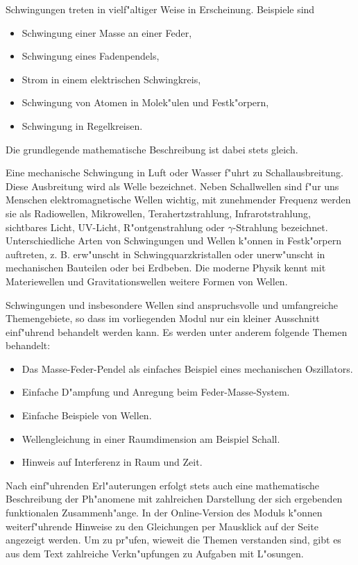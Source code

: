 \begin{MSectionStart}
Schwingungen treten in vielf"altiger Weise in Erscheinung. Beispiele sind 
\begin{itemize}
  \item Schwingung einer Masse an einer Feder,
  \item Schwingung eines Fadenpendels,
  \item Strom in einem elektrischen Schwingkreis,
  \item Schwingung von Atomen in Molek"ulen und Festk"orpern,
  \item Schwingung in Regelkreisen.
\end{itemize}
Die grundlegende mathematische Beschreibung ist dabei stets gleich.

Eine mechanische Schwingung in Luft oder Wasser f"uhrt zu Schallausbreitung. Diese Ausbreitung wird als Welle bezeichnet. Neben Schallwellen sind f"ur uns Menschen elektromagnetische Wellen wichtig, mit zunehmender Frequenz werden sie als Radiowellen, Mikrowellen, Terahertzstrahlung, Infrarotstrahlung, sichtbares Licht, UV-Licht, R"ontgenstrahlung oder $\gamma$-Strahlung bezeichnet. Unterschiedliche Arten von Schwingungen und Wellen k"onnen in Festk"orpern auftreten, z. B. erw"unscht in Schwingquarzkristallen oder unerw"unscht in mechanischen Bauteilen oder bei Erdbeben. Die moderne Physik kennt mit Materiewellen und Gravitationswellen weitere Formen von Wellen.

Schwingungen und insbesondere Wellen sind anspruchsvolle und umfangreiche Themengebiete, so dass im vorliegenden Modul nur ein kleiner Ausschnitt einf"uhrend behandelt werden kann. Es werden unter anderem folgende Themen behandelt:
\begin{itemize}
  \item Das Masse-Feder-Pendel als einfaches Beispiel eines mechanischen Oszillators.
  \item Einfache D"ampfung und Anregung beim Feder-Masse-System.
  \item Einfache Beispiele von Wellen.
  \item Wellengleichung in einer Raumdimension am Beispiel Schall.
  \item Hinweis auf Interferenz in Raum und Zeit.
\end{itemize}

Nach einf"uhrenden Erl"auterungen erfolgt stets auch eine mathematische Beschreibung der Ph"anomene mit zahlreichen Darstellung der sich ergebenden funktionalen Zusammenh"ange. In der Online-Version des Moduls k"onnen weiterf"uhrende Hinweise zu den Gleichungen per Mausklick auf der Seite angezeigt werden. Um zu pr"ufen, wieweit die Themen verstanden sind, gibt es aus dem Text zahlreiche Verkn"upfungen zu Aufgaben mit L"osungen. 


\end{MSectionStart}
